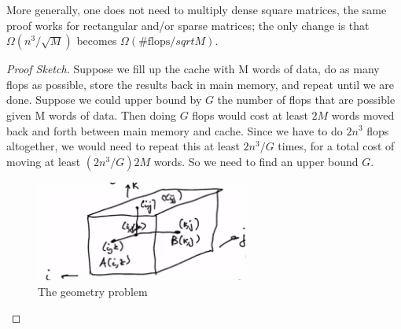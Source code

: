 \documentclass[11pt]{article}
\numberwithin{equation}{section}
\begin{document}
More generally, one does not need to multiply dense square matrices, the same proof works for rectangular and/or sparse matrices; 
the only change is that $\Omega(n^3/\sqrt{M})$ becomes $\Omega(\#\mathrm{flops}/sqrt{M})$.

\begin{proof}[Proof Sketch]
    Suppose we fill up the cache with M words of data, do as many flops as possible, store the results back in main memory,
    and repeat until we are done. Suppose we could upper bound by $G$ the number of flops that are possible given M words of data. 
    Then doing $G$ flops would cost at least $2M$ words moved back and forth between main memory and cache. Since we have to do $2n^3$ flops altogether,
    we would need to repeat this at least $2n^3/G$ times, for a total cost of moving at least $(2n^3/G)2M$ words. So we need to find an upper bound $G$.

    \begin{figure}[h]
        \centering
        \includegraphics[width=7cm]{images/lec4-5.png}
        \caption{The geometry problem}
    \end{figure}
    

\end{proof}
\end{document}
